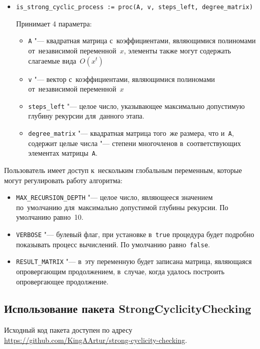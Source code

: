\begin{itemize}
    \item
        \verb|is_strong_cyclic_process := proc(A, v, steps_left, degree_matrix)|

        Принимает 4 параметра:
        \begin{itemize}
            \item
                \verb|A| "--- квадратная матрица с~коэффициентами, являющимися полиномами от~независимой переменной~$x$,
                элементы также могут содержать слагаемые вида~$O(x^t)$
            \item
                \verb|v| "--- вектор с~коэффициентами, являющимися полиномами от~независимой переменной~$x$
            \item
                \verb|steps_left| "--- целое число,
                указывающее максимально допустимую глубину рекурсии для~данного этапа.
            \item
                \verb|degree_matrix| "--- квадратная матрица того~же размера, что и~\verb|A|,
                содержит целые числа "--- степени многочленов в~соответствующих элементах матрицы~\verb|A|.
        \end{itemize}
\end{itemize}


Пользователь имеет доступ к~нескольким глобальным переменным, которые могут регулировать работу алгоритма:
\begin{itemize}
    \item
        \verb|MAX_RECURSION_DEPTH| "--- целое число, являющееся значением по~умолчанию для~максимально допустимой глубины рекурсии.
        По умолчанию равно~10.
    \item
        \verb|VERBOSE| "--- булевый флаг, при установке в~\verb|true| процедура будет подробно показывать процесс вычислений.
        По умолчанию равно~\verb|false|.
    \item
        \verb|RESULT_MATRIX| "--- в~эту переменную будет записана матрица, являющаяся опровергающим продолжением,
        в~случае, когда удалось построить опровергающее продолжение.
\end{itemize}


\newpage
\subsection{Использование пакета StrongCyclicityChecking}

Исходный код пакета доступен по адресу\\
\url{https://github.com/KingAArtur/strong-cyclicity-checking}.

